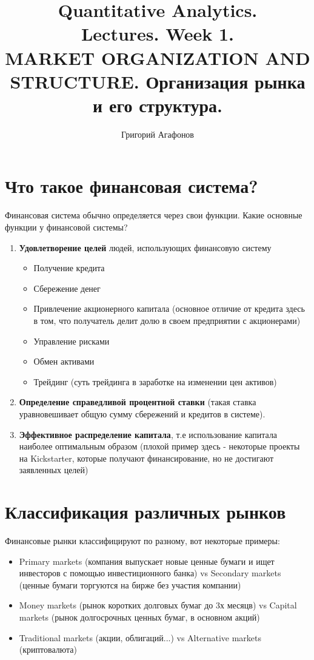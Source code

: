 \documentclass{article}
\title{Quantitative Analytics.\\
Lectures. Week 1. \\
MARKET ORGANIZATION AND STRUCTURE. Организация рынка и его структура.}
\author{Григорий Агафонов}
\begin{document}
\maketitle

\setcounter{tocdepth}{1} %
\renewcommand\contentsname{Contents}
\tableofcontents
\newpage



\renewcommand{\labelitemi}{\tiny$\bullet$}
\renewcommand{\figurename}{Fig.}

\section{Что такое финансовая система?}
	Финансовая система обычно определяется через свои функции. Какие основные функции у финансовой системы?
	\begin{enumerate}
		\item \textbf{Удовлетворение целей} людей, использующих финансовую систему
		\begin{itemize}
			\item Получение кредита
			\item Сбережение денег
			\item Привлечение акционерного капитала (основное отличие от кредита здесь в том, что получатель делит долю в своем предприятии с акционерами)
			\item Управление рисками 
			\item Обмен активами 
			\item Трейдинг (суть трейдинга в заработке на изменении цен активов)
		\end{itemize}
	\item \textbf{Определение справедливой процентной ставки} (такая ставка уравновешивает общую сумму сбережений и кредитов в системе).
	\item \textbf{Эффективное распределение капитала}, т.е использование капитала наиболее оптимальным образом (плохой пример здесь - некоторые проекты на Kickstarter, которые получают финансирование, но не достигают заявленных целей)
		
	\end{enumerate}
\section{Классификация различных рынков}
Финансовые рынки классифицируют по разному, вот некоторые примеры:
\begin{itemize}
	\item Primary markets (компания выпускает новые ценные бумаги и ищет инвесторов с помощью инвестиционного банка) vs Secondary markets (ценные бумаги торгуются на бирже без участия компании)
	\item Money markets (рынок коротких долговых бумаг до 3х месяцв) vs Capital markets (рынок долгосрочных ценных бумаг, в основном акций)
	\item Traditional markets (акции, облигаций...) vs Alternative markets (криптовалюта) 
\end{itemize}
\end{document}
